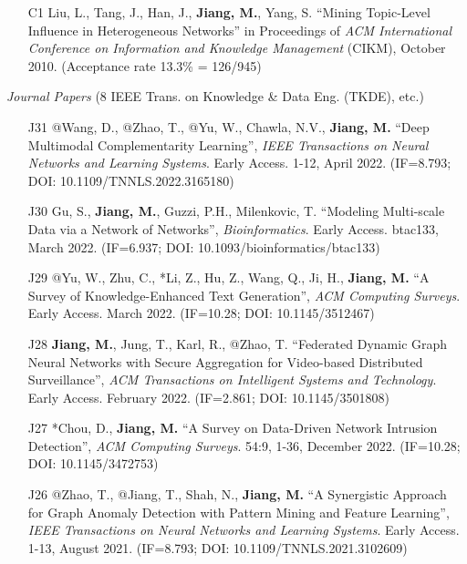 \documentclass[10pt]{article}
\newenvironment{myindentpar}[1]%
{\begin{list}{}%
         {\setlength{\leftmargin}{#1}}%
         \item[]%
}
{\end{list}}
\newcounter{list}
\begin{document}
\begin{myindentpar}{0.00cm}
\begin{enumerate}[leftmargin=.5cm]
\item[C1] Liu, L., Tang, J., Han, J., \textbf{Jiang, M.}, Yang, S. ``Mining Topic-Level Influence in Heterogeneous Networks'' in Proceedings of \textit{ACM International Conference on Information and Knowledge Management} (CIKM), October 2010. (Acceptance rate 13.3\% = 126/945)

\end{enumerate}

\hspace{-0.25cm}\textit{Journal Papers} {\small (8 IEEE Trans. on Knowledge \& Data Eng. (TKDE), etc.)}

\begin{enumerate}[leftmargin=.5cm]

\item[J31] @Wang, D., @Zhao, T., @Yu, W., Chawla, N.V., \textbf{Jiang, M.} ``Deep Multimodal Complementarity Learning'', \textit{IEEE Transactions on Neural Networks and Learning Systems}. Early Access. 1-12, April 2022. (IF=8.793; DOI: 10.1109/TNNLS.2022.3165180)

\item[J30] Gu, S., \textbf{Jiang, M.}, Guzzi, P.H., Milenkovic, T. ``Modeling Multi-scale Data via a Network of Networks'', \textit{Bioinformatics}. Early Access. btac133, March 2022. (IF=6.937; DOI: 10.1093/bioinformatics/btac133)

\item[J29] @Yu, W., Zhu, C., *Li, Z., Hu, Z., Wang, Q., Ji, H., \textbf{Jiang, M.} ``A Survey of Knowledge-Enhanced Text Generation'', \textit{ACM Computing Surveys}. Early Access. March 2022. (IF=10.28; DOI: 10.1145/3512467)

\item[J28] \textbf{Jiang, M.}, Jung, T., Karl, R., @Zhao, T. ``Federated Dynamic Graph Neural Networks with Secure Aggregation for Video-based Distributed Surveillance'', \textit{ACM Transactions on Intelligent Systems and Technology}. Early Access. February 2022. (IF=2.861; DOI: 10.1145/3501808)

\item[J27] *Chou, D., \textbf{Jiang, M.} ``A Survey on Data-Driven Network Intrusion Detection'', \textit{ACM Computing Surveys}. 54:9, 1-36, December 2022. (IF=10.28; DOI: 10.1145/3472753)

\item[J26] @Zhao, T., @Jiang, T., Shah, N., \textbf{Jiang, M.} ``A Synergistic Approach for Graph Anomaly Detection with Pattern Mining and Feature Learning'', \textit{IEEE Transactions on Neural Networks and Learning Systems}. Early Access. 1-13, August 2021. (IF=8.793; DOI: 10.1109/TNNLS.2021.3102609)


\end{enumerate}
\end{myindentpar}
\end{document}
